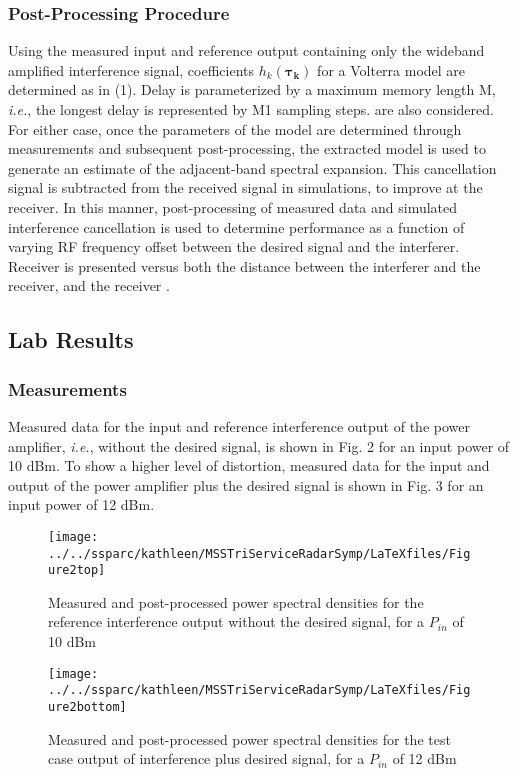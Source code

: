 \documentclass[11pt,onecolumn]{IEEEtran}
\begin{document}
\subsubsection{Post-Processing Procedure}
Using the measured input and reference output containing only the wideband amplified interference signal, coefficients  $h_k( \boldsymbol{\tau_k})$ for a Volterra model are determined as in (1).  Delay is parameterized by a maximum memory length M, \emph{i.e.}, the longest delay is represented by M\hspace{1pt}\textendash\hspace{0.25pt}1 sampling steps.  \OMP are also considered.  For either case, once the parameters of the model are determined through measurements and subsequent post-processing, the extracted model is used to generate an estimate of the adjacent-band spectral expansion.  This cancellation signal is subtracted from the received signal in simulations, to improve \SINR at the receiver.  In this manner, post-processing of measured data and simulated interference cancellation is used to determine performance as a function of varying RF frequency offset between the desired signal and the interferer.  Receiver \SINR is presented versus both the distance between the interferer and the receiver, and the receiver \SNR.


\subsection{Lab Results}
\subsubsection{Measurements}
Measured data for the input and reference interference output of the power amplifier, \emph{i.e.}, without the desired signal, is shown in Fig. 2 for an input power of 10 dBm.  To show a higher level of distortion, measured data for the input and output of the power amplifier plus the desired signal is shown in Fig. 3 for an input power of 12 dBm.  


\begin{figure}[ht]
\centering
\begin{minipage}[b]{0.45\linewidth}
\texttt{[image: ../../ssparc/kathleen/MSSTriServiceRadarSymp/LaTeXfiles/Figure2top]}  %
\caption{Measured and post-processed power spectral densities for the reference interference output without the desired signal, for a $P_{in}$ of 10 dBm}
\label{fig_sim}
\end{minipage}
\quad
\begin{minipage}[b]{0.45\linewidth}
\texttt{[image: ../../ssparc/kathleen/MSSTriServiceRadarSymp/LaTeXfiles/Figure2bottom]}  %
\caption{Measured and post-processed power spectral densities for the test case output of interference plus desired signal, for a $P_{in}$ of 12 dBm}
\label{fig_sim}
\end{minipage}
\end{figure}
\end{document}
